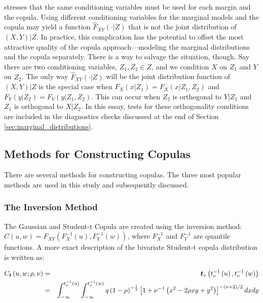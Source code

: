 \documentclass[12pt]{article}
\begin{document}
\cite{Patton_2006} stresses that the same conditioning variables must be used for each margin and the copula. Using different conditioning variables for the marginal models and the copula may yield a function $\hat{F}_{XY}\left(\cdot|Z\right)$ that is not the joint distribution of $\left(X,Y\right)|Z$. In practice, this complication has the potential to offset the most attractive quality of the copula approach---modeling the marginal distributions and the copula separately. There is a way to salvage the situation, though. Say there are two conditioning variables, $Z_{1}, Z_{2} \in Z$, and we condition $X$ on $Z_{1}$ and $Y$ on $Z_{2}$. The only way $\hat{F}_{XY}\left(\cdot|Z\right)$ will be the joint distribution function of $\left(X,Y\right)|Z$ is the special case when $F_{X}\left(x|Z_{1}\right) = F_{X}\left(x|Z_{1},Z_{2}\right)$ and $F_{Y}\left(y|Z_{2}\right) = F_{Y}\left(y|Z_{1},Z_{2}\right)$. This can occur when $Z_{2}$ is orthogonal to $Y|Z_{1}$ and $Z_{1}$ is orthogonal to $X|Z_{2}$. In this essay, tests for these orthogonality conditions are included in the diagnostics checks discussed at the end of Section \ref{sec:marginal_distributions}.


\subsection{Methods for Constructing Copulas}

There are several methods for constructing copulas. The three most popular methods are used in this study and subsequently discussed.

\subsubsection{The Inversion Method}

The Gaussian and Student-t Copula are created using the inversion method: $C\left(u,w\right) = F_{XY}\left(F_{X}^{-1}\left(u\right),F_{Y}^{-1}\left(w\right)\right)$, where $F_{X}^{-1}$ and $F_{Y}^{-1}$ are quantile functions. A more exact description of the bivariate Student-t copula distribution is written as:

\begin{eqnarray} \label{eq:stdTinv}
	C_{\boldsymbol{t}}\left(u,w;\rho,\nu\right) &=& \boldsymbol{t}_{v}\left(t_{\nu}^{-1}\left(u\right), t_{\nu}^{-1}\left(w\right)\right) \\
	&=& \int_{-\infty}^{t_{\nu}^{-1}\left(u\right)}\int_{-\infty}^{t_{\nu}^{-1}\left(w\right)}q\left(1-\rho\right)^{-\frac{1}{2}}\left[1+\nu^{-1}\left(x^{2}-2\rho xy + y^{2}\right)\right]^{-\left(\nu + 2\right)
	/2}dxdy \notag
\end{eqnarray}
\end{document}
